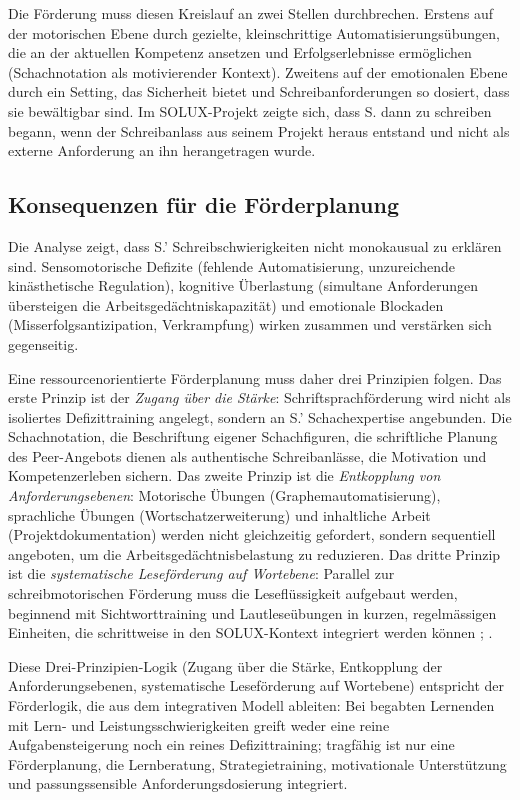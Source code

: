 \documentclass[ngerman, a4paper]{article}
\begin{document}
Die Förderung muss diesen Kreislauf an zwei Stellen durchbrechen. Erstens auf der
motorischen Ebene durch gezielte, kleinschrittige Automatisierungsübungen, die an
der aktuellen Kompetenz ansetzen und Erfolgserlebnisse ermöglichen (Schachnotation
als motivierender Kontext). Zweitens auf der emotionalen Ebene durch ein Setting, das
Sicherheit bietet und Schreibanforderungen so dosiert, dass sie bewältigbar sind. Im
SOLUX-Projekt zeigte sich, dass S. dann zu schreiben begann, wenn der Schreibanlass
aus seinem Projekt heraus entstand und nicht als externe Anforderung an ihn
herangetragen wurde.

\subsection{Konsequenzen für die Förderplanung}

Die Analyse zeigt, dass S.' Schreibschwierigkeiten nicht monokausual zu erklären sind.
Sensomotorische Defizite (fehlende Automatisierung, unzureichende kinästhetische
Regulation), kognitive Überlastung (simultane Anforderungen übersteigen die
Arbeitsgedächtniskapazität) und emotionale Blockaden (Misserfolgsantizipation,
Verkrampfung) wirken zusammen und verstärken sich gegenseitig.

Eine ressourcenorientierte Förderplanung muss daher drei Prinzipien folgen. Das erste
Prinzip ist der \textit{Zugang über die Stärke}: Schriftsprachförderung wird nicht als
isoliertes Defizittraining angelegt, sondern an S.' Schachexpertise angebunden. Die
Schachnotation, die Beschriftung eigener Schachfiguren, die schriftliche Planung des
Peer-Angebots dienen als authentische Schreibanlässe, die Motivation und Kompetenzerleben
sichern. Das zweite Prinzip ist die \textit{Entkopplung von Anforderungsebenen}: Motorische
Übungen (Graphemautomatisierung), sprachliche Übungen (Wortschatzerweiterung) und
inhaltliche Arbeit (Projektdokumentation) werden nicht gleichzeitig gefordert, sondern
sequentiell angeboten, um die Arbeitsgedächtnisbelastung zu reduzieren. Das dritte
Prinzip ist die \textit{systematische Leseförderung auf Wortebene}: Parallel zur
schreibmotorischen Förderung muss die Leseflüssigkeit aufgebaut werden, beginnend
mit Sichtworttraining und Lautleseübungen in kurzen, regelmässigen Einheiten, die
schrittweise in den SOLUX-Kontext integriert werden können
\parencite[Kap.\,1--4]{rosebrock2010grundlagen};
\parencite[Kap.\,1--4]{gold2018lesenkannmanlernen}.

Diese Drei-Prinzipien-Logik (Zugang über die Stärke, Entkopplung der
Anforderungsebenen, systematische Leseförderung auf Wortebene) entspricht der
Förderlogik, die \textcite[S.\,397--399]{fischerfischerontrup2014integratives} aus
dem integrativen Modell ableiten: Bei begabten Lernenden mit Lern- und
Leistungsschwierigkeiten greift weder eine reine Aufgabensteigerung noch ein reines
Defizittraining; tragfähig ist nur eine Förderplanung, die Lernberatung,
Strategietraining, motivationale Unterstützung und passungssensible
Anforderungsdosierung integriert.
\end{document}
